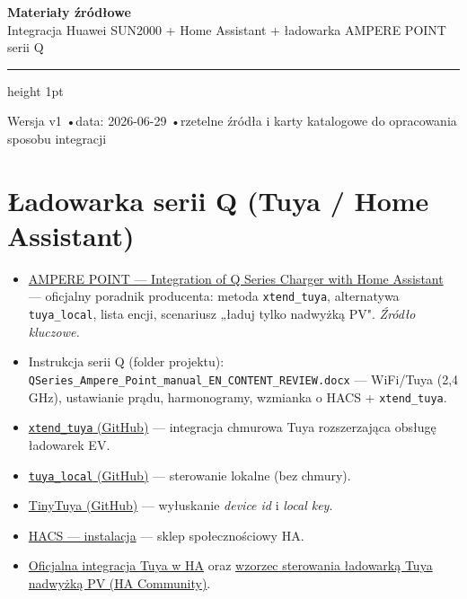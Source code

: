 \documentclass[11pt]{article}
\begin{document}
{\sffamily\bfseries\color{navy}\LARGE Materiały źródłowe}\\[3pt]
{\sffamily\large\color{navy} Integracja Huawei SUN2000 + Home Assistant + ładowarka AMPERE POINT serii Q}\\[6pt]
{\color{rulegrey}\hrule height 1pt}\vspace{4pt}
{\footnotesize\sffamily Wersja v1 \quad•\quad data: 2026-06-29 \quad•\quad rzetelne źródła i karty katalogowe do opracowania sposobu integracji}\\[2pt]

\section{Ładowarka serii Q (Tuya / Home Assistant)}
\begin{itemize}
\item \href{https://www.amperepoint.com/blogs/poradniki/integration-of-ampere-point-q-series-charger-with-home-assistant}{AMPERE POINT — Integration of Q Series Charger with Home Assistant} — oficjalny poradnik producenta: metoda \texttt{xtend\_tuya}, alternatywa \texttt{tuya\_local}, lista encji, scenariusz „ładuj tylko nadwyżką PV". \emph{Źródło kluczowe.}
\item Instrukcja serii Q (folder projektu): \texttt{QSeries\_Ampere\_Point\_manual\_EN\_CONTENT\_REVIEW.docx} — WiFi/Tuya (2,4 GHz), ustawianie prądu, harmonogramy, wzmianka o HACS + \texttt{xtend\_tuya}.
\item \href{https://github.com/azerty9971/xtend_tuya}{\texttt{xtend\_tuya} (GitHub)} — integracja chmurowa Tuya rozszerzająca obsługę ładowarek EV.
\item \href{https://github.com/make-all/tuya-local}{\texttt{tuya\_local} (GitHub)} — sterowanie lokalne (bez chmury).
\item \href{https://github.com/jasonacox/tinytuya}{TinyTuya (GitHub)} — wyłuskanie \emph{device id} i \emph{local key}.
\item \href{https://hacs.xyz/docs/setup/download/}{HACS — instalacja} — sklep społecznościowy HA.
\item \href{https://www.home-assistant.io/integrations/tuya/}{Oficjalna integracja Tuya w HA} oraz \href{https://community.home-assistant.io/t/turn-your-tuya-ev-charger-dynamic-load-balancing-or-solar-controlled/854072}{wzorzec sterowania ładowarką Tuya nadwyżką PV (HA Community)}.
\end{itemize}
\end{document}
